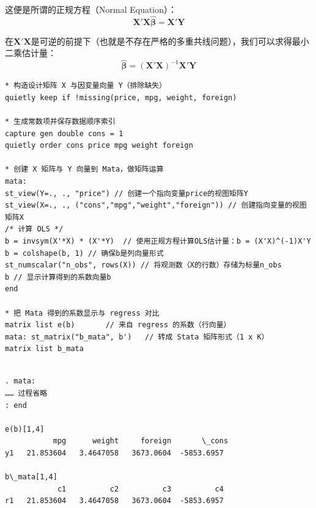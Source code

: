 这便是所谓的正规方程（Normal Equation）：
\begin{equation}
	\mathbf{X}'\mathbf{X}\hat{\boldsymbol{\beta}} = \mathbf{X}'\mathbf{Y}
\end{equation}

在$\mathbf{X}'\mathbf{X}$是可逆的前提下（也就是不存在严格的多重共线问题），我们可以求得最小二乘估计量：
\begin{equation}
	\hat{\boldsymbol{\beta}} = (\mathbf{X}'\mathbf{X})^{-1}\mathbf{X}'\mathbf{Y}
\end{equation}

\begin{tcolorbox}[title=在 Stata 的 Mata 中用矩阵（正规方程）显式计算 OLS 解, colback=white, colframe=black, colbacktitle=white, coltitle=black,fonttitle=\bfseries]
	\begin{lstlisting}[xleftmargin=2em, commentstyle=\color{black}]
* 构造设计矩阵 X 与因变量向量 Y（排除缺失）
quietly keep if !missing(price, mpg, weight, foreign)

* 生成常数项并保存数据顺序索引
capture gen double cons = 1
quietly order cons price mpg weight foreign

* 创建 X 矩阵与 Y 向量到 Mata，做矩阵运算
mata:
st_view(Y=., ., "price") // 创建一个指向变量price的视图矩阵Y
st_view(X=., ., ("cons","mpg","weight","foreign")) // 创建指向变量的视图矩阵X
/* 计算 OLS */
b = invsym(X'*X) * (X'*Y)  // 使用正规方程计算OLS估计量：b = (X'X)^(-1)X'Y
b = colshape(b, 1) // 确保b是列向量形式
st_numscalar("n_obs", rows(X)) // 将观测数（X的行数）存储为标量n_obs
b // 显示计算得到的系数向量b
end

* 把 Mata 得到的系数显示与 regress 对比
matrix list e(b)       // 来自 regress 的系数（行向量）
mata: st_matrix("b_mata", b')   // 转成 Stata 矩阵形式（1 x K）
matrix list b_mata
	\end{lstlisting}
	\vspace{-2em}
	\begin{Verbatim}[commandchars=\\\{\},xleftmargin=2em]

. mata:
…… 过程省略
: end

e(b)[1,4]
           mpg      weight     foreign       \_cons
y1   21.853604   3.4647058   3673.0604  -5853.6957

b\_mata[1,4]
            c1          c2          c3          c4
r1   21.853604   3.4647058   3673.0604  -5853.6957
	\end{Verbatim}

\end{tcolorbox}

